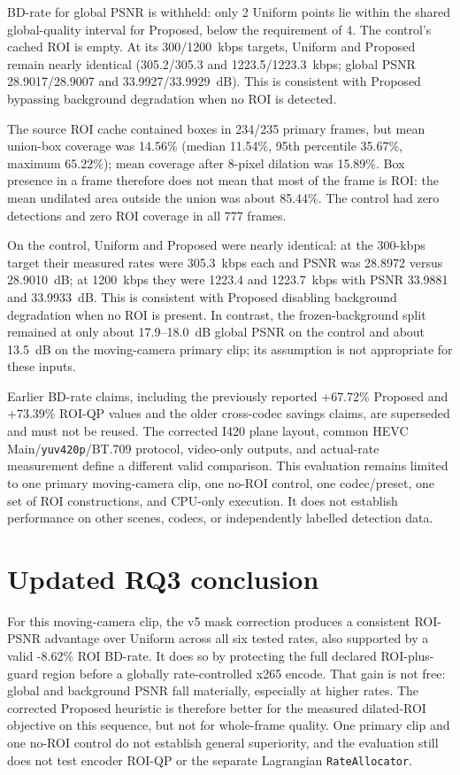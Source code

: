 \documentclass[11pt,a4paper]{article}
\begin{document}
BD-rate for global PSNR is withheld: only 2 Uniform points lie within the
shared global-quality interval for Proposed, below the requirement of 4.
The control's cached ROI is empty. At its 300/1200~kbps targets, Uniform and
Proposed remain nearly identical (305.2/305.3 and 1223.5/1223.3~kbps;
global PSNR 28.9017/28.9007 and 33.9927/33.9929~dB). This is consistent
with Proposed bypassing background degradation when no ROI is detected.

The source ROI cache contained boxes in 234/235 primary frames, but mean
union-box coverage was 14.56\% (median 11.54\%, 95th percentile 35.67\%,
maximum 65.22\%); mean coverage after 8-pixel dilation was 15.89\%. Box
presence in a frame therefore does not mean that most of the frame is ROI:
the mean undilated area outside the union was about 85.44\%. The control had
zero detections and zero ROI coverage in all 777 frames.

On the control, Uniform and Proposed were nearly identical: at the
300-kbps target their measured rates were 305.3~kbps each and PSNR was
28.8972 versus 28.9010~dB; at 1200~kbps they were 1223.4 and 1223.7~kbps
with PSNR 33.9881 and 33.9933~dB. This is consistent with Proposed
disabling background degradation when no ROI is present. In contrast, the
frozen-background split remained at only about 17.9--18.0~dB global PSNR
on the control and about 13.5~dB on the moving-camera primary clip; its
assumption is not appropriate for these inputs.

Earlier BD-rate claims, including the previously reported +67.72\% Proposed
and +73.39\% ROI-QP values and the older cross-codec savings claims, are
superseded and must not be reused. The corrected I420
plane layout, common HEVC Main/\texttt{yuv420p}/BT.709 protocol, video-only
outputs, and actual-rate measurement define a different valid comparison.
This evaluation remains limited to one primary moving-camera clip, one
no-ROI control, one codec/preset, one set of ROI constructions, and
CPU-only execution. It does not establish performance on other scenes,
codecs, or independently labelled detection data.

\section{Updated RQ3 conclusion}

For this moving-camera clip, the v5 mask correction produces a consistent
ROI-PSNR advantage over Uniform across all six tested rates, also supported
by a valid -8.62\% ROI BD-rate. It does so by protecting the full declared
ROI-plus-guard region before a globally rate-controlled x265 encode. That
gain is not free: global and background PSNR fall materially, especially at
higher rates. The corrected Proposed heuristic is therefore better for the
measured dilated-ROI objective on this sequence, but not for whole-frame
quality. One primary clip and one no-ROI control do not establish general
superiority, and the evaluation still does not test encoder ROI-QP or the
separate Lagrangian \texttt{RateAllocator}.
\end{document}
